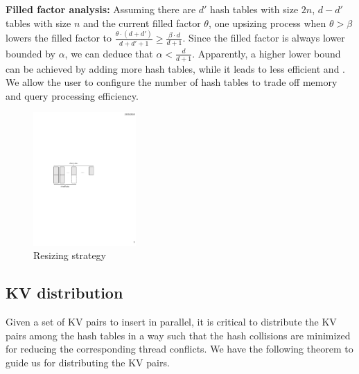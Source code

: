 \vspace{1mm}
\noindent\textbf{Filled factor analysis:}
Assuming there are $d'$ hash tables with size $2n$, $d-d'$ tables with size $n$ and the current filled factor $\theta$, 
one upsizing process when $\theta > \beta$ lowers the filled factor to $\frac{\theta\cdot(d+d')}{d+d'+1} \geq \frac{\beta \cdot d}{d+1}$.  
Since the filled factor is always lower bounded by $\alpha$, we can deduce that $\alpha < \frac{d}{d+1}$.
Apparently, a higher lower bound can be achieved by adding more hash tables, while it leads to less efficient  and . 
We allow the user to configure the number of hash tables to trade off memory and query processing efficiency. 

\begin{figure}[t]
	\centering
	\includegraphics[width=0.35\textwidth]{fig/MultiTable.pdf}
	\caption{Resizing strategy}
	\label{fig:example-resize}
\end{figure}
\subsection{KV distribution}\label{sec:dyn:distribute}
Given a set of KV pairs to insert in parallel, it is critical to distribute the KV pairs among the hash tables in a way such that the hash collisions are minimized for reducing the corresponding thread conflicts. We have the following theorem to guide us for distributing the KV pairs. 

